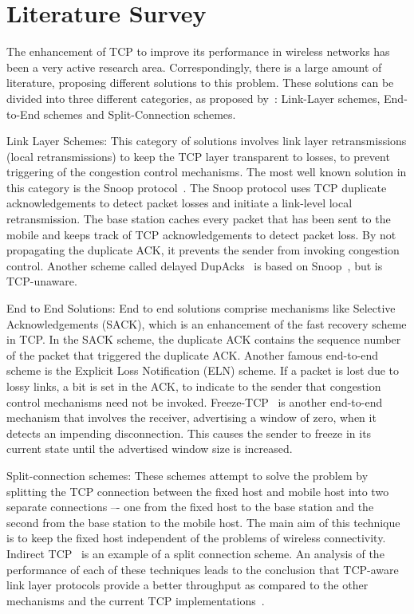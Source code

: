 \documentclass[conference]{IEEEtran}
\begin{document}
\section{Literature Survey}
\label{sec:literature-survey}
The enhancement of TCP to improve its performance in wireless networks has been a very active research area. Correspondingly, there is a large amount of literature, proposing different solutions to this problem. These solutions can be divided into three different categories, as proposed by~\cite{Balakrishnan1997}: Link-Layer schemes, End-to-End schemes and Split-Connection schemes.


Link Layer Schemes: This category of solutions involves link layer retransmissions (local retransmissions) to keep the TCP layer transparent to losses, to prevent triggering of the congestion control mechanisms. The most well known solution in this category is the Snoop protocol~\cite{Balakrishnan1995}. The Snoop protocol uses TCP duplicate acknowledgements to detect packet losses and initiate a link-level local retransmission. The base station caches every packet that has been sent to the mobile and keeps track of TCP acknowledgements to detect packet loss. By not propagating the duplicate ACK, it prevents the sender from invoking congestion control. Another scheme called delayed DupAcks~\cite{Vaidya2002} is based on Snoop~\cite{Balakrishnan1995}, but is TCP-unaware. 

End to End Solutions: End to end solutions comprise mechanisms like Selective Acknowledgements (SACK), which is an enhancement of the fast recovery scheme in TCP. In the SACK scheme, the duplicate ACK contains the sequence number of the packet that triggered the duplicate ACK. Another famous end-to-end scheme is the Explicit Loss Notification (ELN) scheme. If a packet is lost due to lossy links, a bit is set in the ACK, to indicate to the sender that congestion control mechanisms need not be invoked. Freeze-TCP~\cite{Goff2000} is another end-to-end mechanism that involves the receiver, advertising a window of zero, when it detects an impending disconnection. This causes the sender to freeze in its current state until the advertised window size is increased. 

Split-connection schemes: These schemes attempt to solve the problem by splitting the TCP connection between the fixed host and mobile host into two separate connections –- one from the fixed host to the base station and the second from the base station to the mobile host. The main aim of this technique is to keep the fixed host independent of the problems of wireless connectivity. Indirect TCP~\cite{Bakre1995} is an example of a split connection scheme. An analysis of the performance of each of these techniques leads to the conclusion that TCP-aware link layer protocols provide a better throughput as compared to the other mechanisms and the current TCP implementations~\cite{Balakrishnan1997}. 
\end{document}
